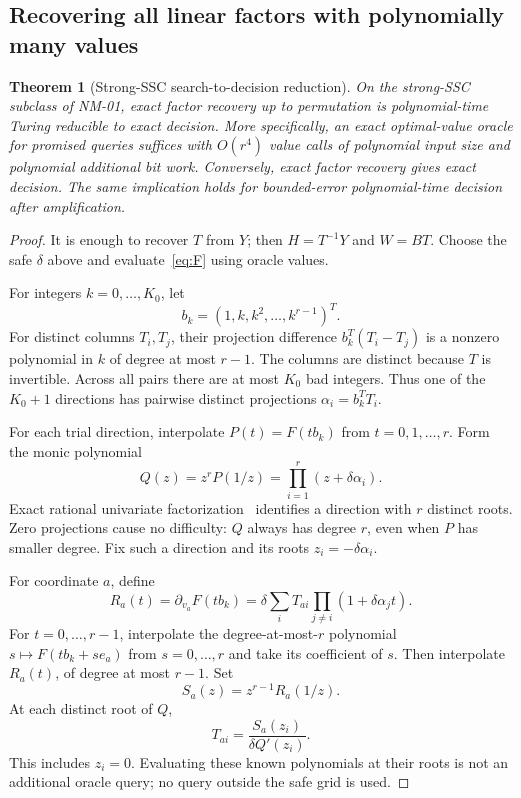 \documentclass[11pt]{article}
\newtheorem{theorem}{Theorem}[section]
\theoremstyle{definition}\newtheorem{definition}[theorem]{Definition}
\begin{document}
\subsection{Recovering all linear factors with polynomially many values}
\begin{theorem}[Strong-SSC search-to-decision reduction]
\label{thm:recovery}
On the strong-SSC subclass of NM-01, exact factor recovery up to permutation is polynomial-time Turing reducible to exact decision. More specifically, an exact optimal-value oracle for promised queries suffices with $O(r^4)$ value calls of polynomial input size and polynomial additional bit work. Conversely, exact factor recovery gives exact decision. The same implication holds for bounded-error polynomial-time decision after amplification.
\end{theorem}
\begin{proof}
It is enough to recover $T$ from $Y$; then $H=T^{-1}Y$ and $W=BT$. Choose the safe $\delta$ above and evaluate~\eqref{eq:F} using oracle values.

For integers $k=0,\ldots,K_0$, let
\begin{equation}
 b_k=(1,k,k^2,\ldots,k^{r-1})^T.
\end{equation}
For distinct columns $T_i,T_j$, their projection difference $b_k^T(T_i-T_j)$ is a nonzero polynomial in $k$ of degree at most $r-1$. The columns are distinct because $T$ is invertible. Across all pairs there are at most $K_0$ bad integers. Thus one of the $K_0+1$ directions has pairwise distinct projections $\alpha_i=b_k^TT_i$.

For each trial direction, interpolate $P(t)=F(tb_k)$ from $t=0,1,\ldots,r$. Form the monic polynomial
\begin{equation}
 Q(z)=z^rP(1/z)=\prod_{i=1}^r(z+\delta\alpha_i).
 \label{eq:Q}
\end{equation}
Exact rational univariate factorization~\cite{lll} identifies a direction with $r$ distinct roots. Zero projections cause no difficulty: $Q$ always has degree $r$, even when $P$ has smaller degree. Fix such a direction and its roots $z_i=-\delta\alpha_i$.

For coordinate $a$, define
\begin{equation}
 R_a(t)=\partial_{v_a}F(tb_k)
       =\delta\sum_i T_{ai}\prod_{j\ne i}(1+\delta\alpha_jt).
\end{equation}
For $t=0,\ldots,r-1$, interpolate the degree-at-most-$r$ polynomial $s\mapsto F(tb_k+se_a)$ from $s=0,\ldots,r$ and take its coefficient of $s$. Then interpolate $R_a(t)$, of degree at most $r-1$. Set
\begin{equation}
 S_a(z)=z^{r-1}R_a(1/z).
\end{equation}
At each distinct root of $Q$,
\begin{equation}
 \boxed{T_{ai}=\frac{S_a(z_i)}{\delta Q'(z_i)}.}
 \label{eq:recoverentry}
\end{equation}
This includes $z_i=0$. Evaluating these known polynomials at their roots is not an additional oracle query; no query outside the safe grid is used.


\end{proof}
\end{document}
